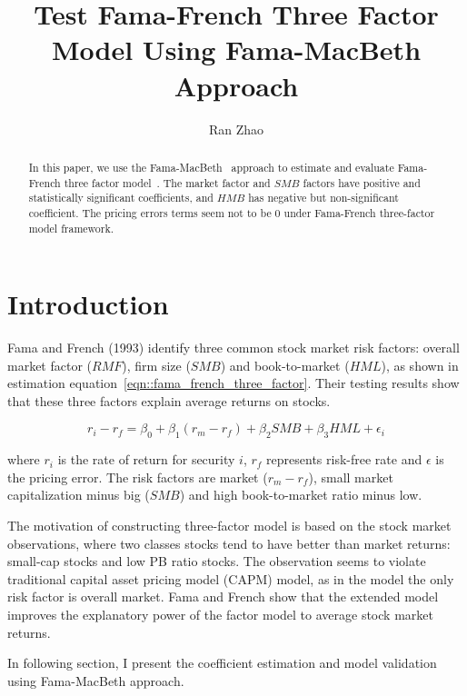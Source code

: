 \documentclass[11pt,reqno,final]{amsart}
\title{Test Fama-French Three Factor Model Using Fama-MacBeth Approach}
\author{Ran Zhao}
\begin{document}
\begin{abstract}
In this paper, we use the Fama-MacBeth~\cite{FM73} approach to estimate and evaluate Fama-French three factor model~\cite{FF93}. The market factor and $SMB$ factors have positive and statistically significant coefficients, and $HMB$ has negative but non-significant coefficient. The pricing errors terms seem not to be 0 under Fama-French three-factor model framework.
\end{abstract}


\maketitle
%
%
%
\section{Introduction}
Fama and French (1993) identify three common stock market risk factors: overall market factor ($RMF$), firm size ($SMB$) and book-to-market ($HML$), as shown in estimation equation~\ref{eqn::fama_french_three_factor}. Their testing results show that these three factors explain average returns on stocks.

\begin{equation} \label{eqn::fama_french_three_factor}
r_i - r_f = \beta_0 + \beta_1 (r_m-r_f) + \beta_2 SMB + \beta_3 HML + \epsilon_i
\end{equation}


where $r_i$ is the rate of return for security $i$, $r_f$ represents risk-free rate and $\epsilon$ is the pricing error. The risk factors are market ($r_m - r_f$), small market capitalization minus big ($SMB$) and high book-to-market ratio minus low.

The motivation of constructing three-factor model is based on the stock market observations, where two classes stocks tend to have better than market returns: small-cap stocks and low PB ratio stocks. The observation seems to violate traditional capital asset pricing model (CAPM) model, as in the model the only risk factor is overall market. Fama and French show that the extended model improves the explanatory power of the factor model to average stock market returns.

In following section, I present the coefficient estimation and model validation using Fama-MacBeth approach.
\end{document}
